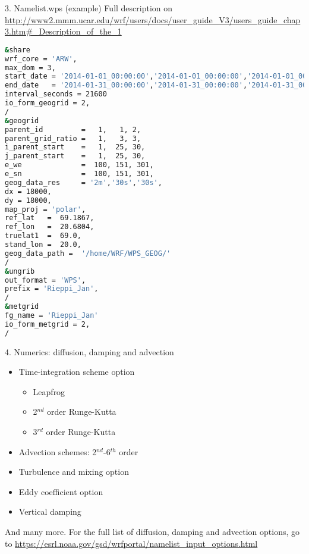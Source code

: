 \documentclass{beamer}
\begin{document}
\begin{frame}[fragile, allowframebreaks=.9, t]{3. Namelist.wps (example)}
Full description on \url{http://www2.mmm.ucar.edu/wrf/users/docs/user_guide_V3/users_guide_chap3.htm#_Description_of_the_1}
\begin{lstlisting}[backgroundcolor = \color{light-gray}, language=bash]
&share
wrf_core = 'ARW',
max_dom = 3,
start_date = '2014-01-01_00:00:00','2014-01-01_00:00:00','2014-01-01_00:00:00',
end_date   = '2014-01-31_00:00:00','2014-01-31_00:00:00','2014-01-31_00:00:00',
interval_seconds = 21600
io_form_geogrid = 2,
/
&geogrid
parent_id         =   1,   1, 2,
parent_grid_ratio =   1,   3, 3,
i_parent_start    =   1,  25, 30,
j_parent_start    =   1,  25, 30,
e_we              =  100, 151, 301,
e_sn              =  100, 151, 301,
geog_data_res     = '2m','30s','30s',
dx = 18000,
dy = 18000,
map_proj = 'polar',
ref_lat   =  69.1867,
ref_lon   =  20.6804,
truelat1  =  69.0,
stand_lon =  20.0,
geog_data_path =  '/home/WRF/WPS_GEOG/'
/
&ungrib
out_format = 'WPS',
prefix = 'Rieppi_Jan',
/
&metgrid
fg_name = 'Rieppi_Jan'
io_form_metgrid = 2, 
/
\end{lstlisting}
\end{frame}



\begin{frame}{4. Numerics: diffusion, damping and advection}
\begin{itemize}
	\item Time-integration scheme option
		\begin{itemize}
			\item Leapfrog
			\item 2$^{nd}$ order Runge-Kutta
			\item 3$^{rd}$ order Runge-Kutta
		\end{itemize}
	\item Advection schemes: 2$^{nd}$-6$^{th}$ order
	\item Turbulence and mixing option
	\item Eddy coefficient option	
	\item Vertical damping
\end{itemize}
And many more. For the full list of diffusion, damping and advection options, go to \url{https://esrl.noaa.gov/gsd/wrfportal/namelist_input_options.html}
\end{frame}
\end{document}
